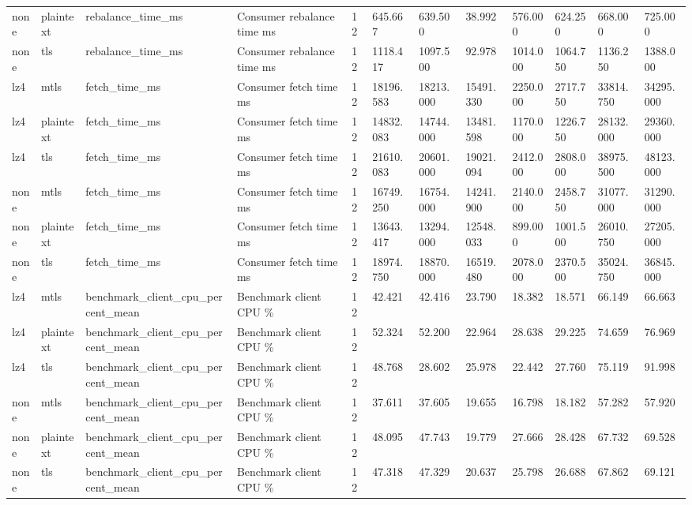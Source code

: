 \begin{longtable}{llllllllllll}
none & plaintext & rebalance\_time\_ms & Consumer rebalance time ms & 12 & 645.667 & 639.500 & 38.992 & 576.000 & 624.250 & 668.000 & 725.000 \\
none & tls & rebalance\_time\_ms & Consumer rebalance time ms & 12 & 1118.417 & 1097.500 & 92.978 & 1014.000 & 1064.750 & 1136.250 & 1388.000 \\
lz4 & mtls & fetch\_time\_ms & Consumer fetch time ms & 12 & 18196.583 & 18213.000 & 15491.330 & 2250.000 & 2717.750 & 33814.750 & 34295.000 \\
lz4 & plaintext & fetch\_time\_ms & Consumer fetch time ms & 12 & 14832.083 & 14744.000 & 13481.598 & 1170.000 & 1226.750 & 28132.000 & 29360.000 \\
lz4 & tls & fetch\_time\_ms & Consumer fetch time ms & 12 & 21610.083 & 20601.000 & 19021.094 & 2412.000 & 2808.000 & 38975.500 & 48123.000 \\
none & mtls & fetch\_time\_ms & Consumer fetch time ms & 12 & 16749.250 & 16754.000 & 14241.900 & 2140.000 & 2458.750 & 31077.000 & 31290.000 \\
none & plaintext & fetch\_time\_ms & Consumer fetch time ms & 12 & 13643.417 & 13294.000 & 12548.033 & 899.000 & 1001.500 & 26010.750 & 27205.000 \\
none & tls & fetch\_time\_ms & Consumer fetch time ms & 12 & 18974.750 & 18870.000 & 16519.480 & 2078.000 & 2370.500 & 35024.750 & 36845.000 \\
lz4 & mtls & benchmark\_client\_cpu\_percent\_mean & Benchmark client CPU \% & 12 & 42.421 & 42.416 & 23.790 & 18.382 & 18.571 & 66.149 & 66.663 \\
lz4 & plaintext & benchmark\_client\_cpu\_percent\_mean & Benchmark client CPU \% & 12 & 52.324 & 52.200 & 22.964 & 28.638 & 29.225 & 74.659 & 76.969 \\
lz4 & tls & benchmark\_client\_cpu\_percent\_mean & Benchmark client CPU \% & 12 & 48.768 & 28.602 & 25.978 & 22.442 & 27.760 & 75.119 & 91.998 \\
none & mtls & benchmark\_client\_cpu\_percent\_mean & Benchmark client CPU \% & 12 & 37.611 & 37.605 & 19.655 & 16.798 & 18.182 & 57.282 & 57.920 \\
none & plaintext & benchmark\_client\_cpu\_percent\_mean & Benchmark client CPU \% & 12 & 48.095 & 47.743 & 19.779 & 27.666 & 28.428 & 67.732 & 69.528 \\
none & tls & benchmark\_client\_cpu\_percent\_mean & Benchmark client CPU \% & 12 & 47.318 & 47.329 & 20.637 & 25.798 & 26.688 & 67.862 & 69.121 \\

\end{longtable}
